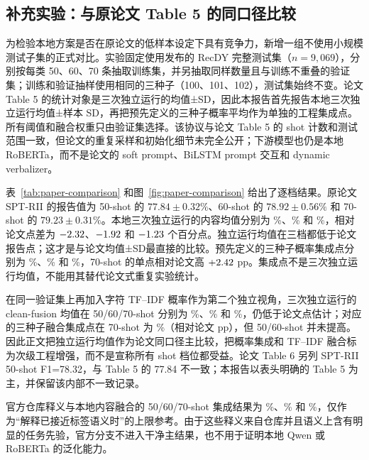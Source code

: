 \documentclass[UTF8,zihao=-4,a4paper]{ctexart}
\begin{document}
\subsection{补充实验：与原论文 Table 5 的同口径比较}

为检验本地方案是否在原论文的低样本设定下具有竞争力，新增一组不使用小规模测试子集的正式对比。实验固定使用发布的 RecDY 完整测试集（$n=9{,}069$），分别按每类 50、60、70 条抽取训练集，并另抽取同样数量且与训练不重叠的验证集；训练和验证抽样使用相同的三种子（100、101、102），测试集始终不变。论文 Table 5 的统计对象是三次独立运行的均值±SD，因此本报告首先报告本地三次独立运行均值±样本 SD，再把预先定义的三种子概率平均作为单独的工程集成点。所有阈值和融合权重只由验证集选择。该协议与论文 Table 5 的 shot 计数和测试范围一致，但论文的重复采样和初始化细节未完全公开；下游模型也仍是本地 RoBERTa，而不是论文的 soft prompt、BiLSTM prompt 交互和 dynamic verbalizer。

表~\ref{tab:paper-comparison} 和图~\ref{fig:paper-comparison} 给出了逐档结果。原论文 SPT-RII 的报告值为 50-shot 的 $77.84\pm0.32\%$、60-shot 的 $78.92\pm0.56\%$ 和 70-shot 的 $79.23\pm0.31\%$。本地三次独立运行的内容均值分别为 \PaperMatchedContentMeanFifty\%、\PaperMatchedContentMeanSixty\% 和 \PaperMatchedContentMeanSeventy\%，相对论文点差为 $-2.32$、$-1.92$ 和 $-1.23$ 个百分点。独立运行均值在三档都低于论文报告点；这才是与论文均值±SD最直接的比较。预先定义的三种子概率集成点分别为 \PaperMatchedContentEnsembleFifty\%、\PaperMatchedContentEnsembleSixty\% 和 \PaperMatchedContentEnsembleSeventy\%，70-shot 的单点相对论文高 $+2.42$ pp。集成点不是三次独立运行均值，不能用其替代论文式重复实验统计。

在同一验证集上再加入字符 TF--IDF 概率作为第二个独立视角，三次独立运行的 clean-fusion 均值在 50/60/70-shot 分别为 \PaperMatchedFusionMeanFifty\%、\PaperMatchedFusionMeanSixty\% 和 \PaperMatchedFusionMeanSeventy\%，仍低于论文点估计；对应的三种子融合集成点在 70-shot 为 \PaperMatchedFusionEnsembleSeventy\%（相对论文 \PaperMatchedFusionEnsembleDeltaSeventy pp），但 50/60-shot 并未提高。因此正文把独立运行均值作为论文同口径主比较，把概率集成和 TF--IDF 融合标为次级工程增强，而不是宣称所有 shot 档位都受益。论文 Table 6 另列 SPT-RII 50-shot F1=78.32，与 Table 5 的 77.84 不一致；本报告以表头明确的 Table 5 为主，并保留该内部不一致记录。

官方仓库释义与本地内容融合的 50/60/70-shot 集成结果为 \PaperMatchedOracleFifty\%、\PaperMatchedOracleSixty\% 和 \PaperMatchedOracleSeventy\%，仅作为“解释已接近标签语义时”的上限参考。由于这些释义来自仓库并且语义上含有明显的任务先验，官方分支不进入干净主结果，也不用于证明本地 Qwen 或 RoBERTa 的泛化能力。
\end{document}
